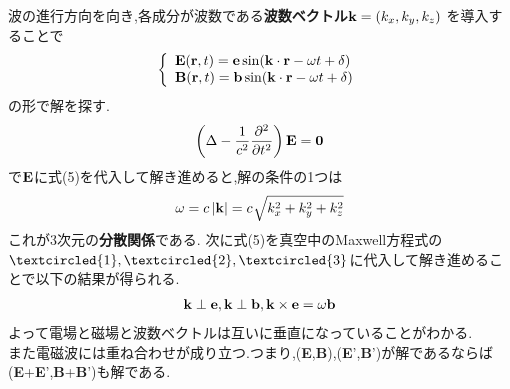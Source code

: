 \documentclass{jsarticle}
\begin{document}
波の進行方向を向き,各成分が波数である{\bf 波数ベクトル}${\bf k}=(k_x,k_y,k_z)$ を導入することで
\begin{eqnarray}
\left \{
\begin{array}{l}
{\bf E}({\bf r},t)={\bf e} \sin({\bf k}\cdot{\bf r}-\omega t + \delta) \\
{\bf B}({\bf r},t)={\bf b} \sin({\bf k}\cdot{\bf r}-\omega t + \delta)
\end{array}
\right.
\end{eqnarray}
の形で解を探す.
\begin{eqnarray*}
\left( \Delta - \frac{1}{c^2}\frac{\partial^2}{\partial t^2} \right) {\bf E} = {\bf 0}
\end{eqnarray*}
で${\bf E}$に式(5)を代入して解き進めると,解の条件の1つは
\begin{eqnarray*}
\omega=c\left| {\bf k} \right| = c \ \sqrt[]{\mathstrut k_x^2+k_y^2+k_z^2}
\end{eqnarray*}
これが3次元の{\bf 分散関係}である.
次に式(5)を真空中のMaxwell方程式の$\textcircled{\scriptsize 1},\textcircled{\scriptsize 2},\textcircled{\scriptsize 3}$に代入して解き進めることで以下の結果が得られる.
\begin{eqnarray*}
{\bf k} \perp {\bf e}, {\bf k} \perp {\bf b},{\bf k} \times {\bf e} = \omega {\bf b}
\end{eqnarray*}
よって電場と磁場と波数ベクトルは互いに垂直になっていることがわかる. \\
また電磁波には重ね合わせが成り立つ.つまり,({\bf E},{\bf B}),({\bf E}',{\bf B}')が解であるならば({\bf E}+{\bf E}',{\bf B}+{\bf B}')も解である.
\end{document}
